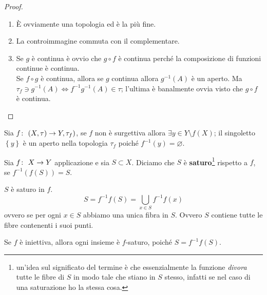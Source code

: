 \begin{proof} \
	\begin{enumerate}
		\item È ovviamente una topologia ed è la più fine. 
		\item La controimmagine commuta con il complementare. 
		\item Se $g$ è continua è ovvio che $g \circ f$ è continua perché la composizione di funzioni continue è continua. \\ Se $f\circ g$ è continua, allora se $g$ continua allora $g^{-1}(A)$ è un aperto. Ma $ \tau_f \ni g^{-1}(A) \Leftrightarrow f^{-1}g^{-1}(A) \in \tau$; l'ultima è banalmente ovvia visto che $g \circ f$ è continua. 
	\end{enumerate}
\end{proof}

\begin{remark}
	Sia $f \colon\ (X, \tau) \rightarrow Y, \tau_f)$, se $f$ non è surgettiva allora $\exists y \in Y \setminus f(X)$; il singoletto $\left\{y\right\}$ è un aperto nella topologia $\tau_f$ poiché $f^{-1}(y) = \varnothing$.
\end{remark} 

\begin{definition}
	Sia $f \colon\ X \rightarrow Y$ applicazione e sia $S \subset X$. Diciamo che $S$ è \textbf{saturo}\footnote{un'idea sul significato del termine è che essenzialmente la funzione \textit{divora} tutte le fibre di $S$ in modo tale che stiano in $S$ stesso, infatti se nel caso di una saturazione ho la stessa cosa.} rispetto a $f$, se $f^{-1}(f(S)) = S$.
\end{definition} 

\begin{remark}
	$S$ è saturo in $f$.
	\begin{equation*}
		S = f^{-1}f(S) = \bigcup_{x \in S} f^{-1}f(x)
	\end{equation*}
	ovvero se per ogni $x \in S$ abbiamo una unica fibra in $S$. Ovvero $S$ contiene tutte le fibre contenenti i suoi punti. 
\end{remark} 

\begin{remark}
	Se $f$ è iniettiva, allora ogni insieme è $f$-saturo, poiché $S = f^{-1}f(S)$.
\end{remark}

